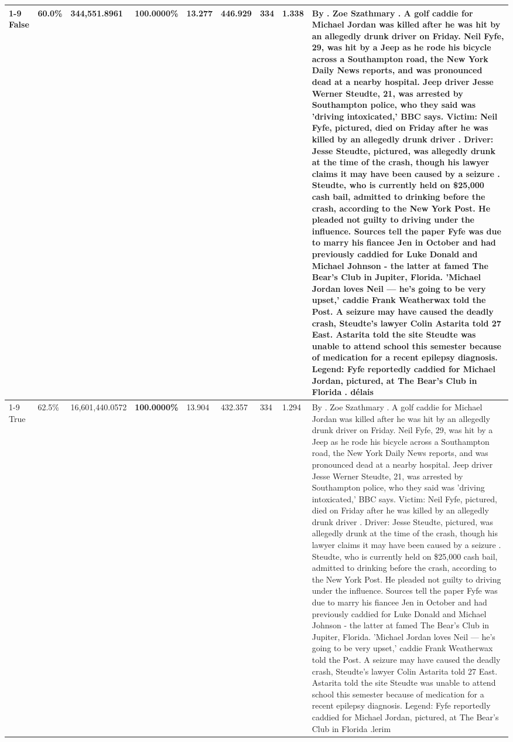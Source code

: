 \begin{table}[H]
\begin{tabular}{lllrlllll}
\cline{1-9}
False & 60.0\% & 344,551.8961 & \bfseries \color{red} 100.0000\% & 13.277 & 446.929 & 334 & 1.338 & By . Zoe Szathmary . A golf caddie for Michael Jordan was killed after he was hit by an allegedly drunk driver on Friday. Neil Fyfe, 29, was hit by a Jeep as he rode his bicycle across a Southampton road, the New York Daily News reports, and was pronounced dead at a nearby hospital. Jeep driver Jesse Werner Steudte, 21, was arrested by Southampton police, who they said was 'driving intoxicated,' BBC says. Victim: Neil Fyfe, pictured, died on Friday after he was killed by an allegedly drunk driver . Driver: Jesse Steudte, pictured, was allegedly drunk at the time of the crash, though his lawyer claims it may have been caused by a seizure . Steudte, who is currently held on \$25,000 cash bail, admitted to drinking before the crash, according to the New York Post. He pleaded not guilty to driving under the influence. Sources tell the paper Fyfe was due to marry his fiancee Jen in October and had previously caddied for Luke Donald and Michael Johnson - the latter at famed The Bear's Club in Jupiter, Florida. 'Michael Jordan loves Neil — he’s going to be very upset,' caddie Frank Weatherwax told the Post. A seizure may have caused the deadly crash, Steudte's lawyer Colin Astarita told 27 East. Astarita told the site Steudte was unable to attend school this semester because of medication for a recent epilepsy diagnosis. Legend: Fyfe reportedly caddied for Michael Jordan, pictured, at The Bear's Club in Florida . délais \\
\cline{1-9}
True & 62.5\% & 16,601,440.0572 & \bfseries \color{red} 100.0000\% & 13.904 & 432.357 & 334 & 1.294 & By . Zoe Szathmary . A golf caddie for Michael Jordan was killed after he was hit by an allegedly drunk driver on Friday. Neil Fyfe, 29, was hit by a Jeep as he rode his bicycle across a Southampton road, the New York Daily News reports, and was pronounced dead at a nearby hospital. Jeep driver Jesse Werner Steudte, 21, was arrested by Southampton police, who they said was 'driving intoxicated,' BBC says. Victim: Neil Fyfe, pictured, died on Friday after he was killed by an allegedly drunk driver . Driver: Jesse Steudte, pictured, was allegedly drunk at the time of the crash, though his lawyer claims it may have been caused by a seizure . Steudte, who is currently held on \$25,000 cash bail, admitted to drinking before the crash, according to the New York Post. He pleaded not guilty to driving under the influence. Sources tell the paper Fyfe was due to marry his fiancee Jen in October and had previously caddied for Luke Donald and Michael Johnson - the latter at famed The Bear's Club in Jupiter, Florida. 'Michael Jordan loves Neil — he’s going to be very upset,' caddie Frank Weatherwax told the Post. A seizure may have caused the deadly crash, Steudte's lawyer Colin Astarita told 27 East. Astarita told the site Steudte was unable to attend school this semester because of medication for a recent epilepsy diagnosis. Legend: Fyfe reportedly caddied for Michael Jordan, pictured, at The Bear's Club in Florida .lerim \\

\end{tabular}
\end{table}

